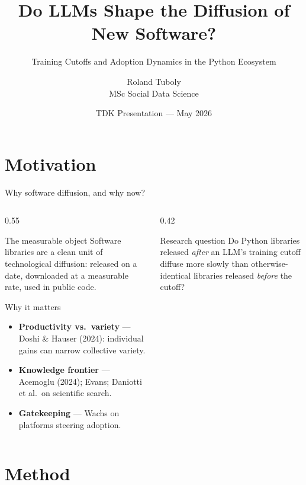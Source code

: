 \documentclass[10pt, aspectratio=169]{beamer}
\title{Do LLMs Shape the Diffusion of New Software?}
\subtitle{Training Cutoffs and Adoption Dynamics in the Python Ecosystem}
\author{Roland Tuboly \\ \small MSc Social Data Science}
\date{TDK Presentation --- May 2026}
\begin{document}
\maketitle

\section{Motivation}

\begin{frame}{Why software diffusion, and why now?}
    \begin{columns}[T]
        \begin{column}{0.55\textwidth}
            \begin{block}{The measurable object}
                Software libraries are a clean unit of technological diffusion: released on a date, downloaded at a measurable rate, used in public code.
            \end{block}
            \begin{block}{Why it matters}
                \begin{itemize}
                    \item \textbf{Productivity vs.\ variety} --- Doshi \& Hauser (2024): individual gains can narrow collective variety.
                    \item \textbf{Knowledge frontier} --- Acemoglu (2024); Evans; Daniotti et al.\ on scientific search.
                    \item \textbf{Gatekeeping} --- Wachs on platforms steering adoption.
                \end{itemize}
            \end{block}
        \end{column}
        \begin{column}{0.42\textwidth}
            \begin{alertblock}{Research question}
                Do Python libraries released \emph{after} an LLM's training cutoff diffuse more slowly than otherwise-identical libraries released \emph{before} the cutoff?
            \end{alertblock}
        \end{column}
    \end{columns}
\end{frame}

\section{Method}
\end{document}
